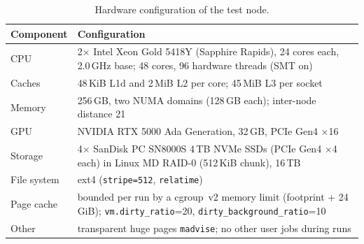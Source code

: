 \begin{table}[t]
\centering
\small
\setlength{\tabcolsep}{3pt}
\begin{tabular}{@{}p{}p{}@{}}
\toprule
Component & Configuration \\
\midrule
CPU & 2$\times$ Intel Xeon Gold 5418Y (Sapphire Rapids), 24 cores each,
      2.0\,GHz base; 48 cores, 96 hardware threads (SMT on) \\
Caches & 48\,KiB L1d and 2\,MiB L2 per core; 45\,MiB L3 per socket \\
Memory & 256\,GB, two NUMA domains (128\,GB each); inter-node distance 21 \\
GPU & NVIDIA RTX 5000 Ada Generation, 32\,GB, PCIe Gen4 $\times$16 \\
Storage & 4$\times$ SanDisk PC SN8000S 4\,TB NVMe SSDs (PCIe Gen4 $\times$4 each)
          in Linux MD RAID-0 (512\,KiB chunk), 16\,TB \\
File system & ext4 (\texttt{stripe=512}, \texttt{relatime}) \\
Page cache & bounded per run by a cgroup~v2 memory limit (footprint + 24\,GiB);
             \texttt{vm.dirty\_ratio}=20, \texttt{dirty\_background\_ratio}=10 \\
Other & transparent huge pages \texttt{madvise}; no other user jobs during runs \\
\bottomrule
\end{tabular}
\caption{Hardware configuration of the test node.}
\label{tab:hw}
\end{table}

